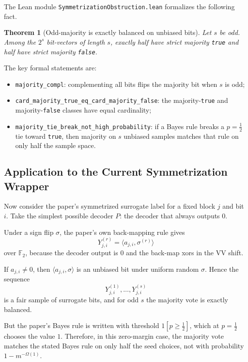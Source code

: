 \documentclass[11pt]{article}
\newtheorem{theorem}{Theorem}[section]
\theoremstyle{remark}
\begin{document}
The Lean module \texttt{SymmetrizationObstruction.lean} formalizes the following fact.

\begin{theorem}[Odd-majority is exactly balanced on unbiased bits]
Let \(s\) be odd.  Among the \(2^s\) bit-vectors of length \(s\), exactly half have strict majority
\texttt{true} and half have strict majority \texttt{false}.
\end{theorem}

\noindent
The key formal statements are:
\begin{itemize}[leftmargin=1.5em]
  \item \texttt{majority\_compl}: complementing all bits flips the majority bit when \(s\) is odd;
  \item \texttt{card\_majority\_true\_eq\_card\_majority\_false}: the majority-\texttt{true} and
  majority-\texttt{false} classes have equal cardinality;
  \item \texttt{majority\_tie\_break\_not\_high\_probability}: if a Bayes rule breaks a
  \(p=\tfrac12\) tie toward \texttt{true}, then majority on \(s\) unbiased samples matches that rule
  on only half the sample space.
\end{itemize}

\subsection{Application to the Current Symmetrization Wrapper}

Now consider the paper's symmetrized surrogate label for a fixed block \(j\) and bit \(i\).  Take
the simplest possible decoder \(P\): the decoder that always outputs \(0\).

Under a sign flip \(\sigma\), the paper's own back-mapping rule gives
\[
  Y^{(r)}_{j,i} = \langle a_{j,i}, \sigma^{(r)} \rangle
\]
over \(\mathbb{F}_2\), because the decoder output is \(0\) and the back-map xors in the VV shift.

If \(a_{j,i} \neq 0\), then \(\langle a_{j,i}, \sigma \rangle\) is an unbiased bit under uniform random
\(\sigma\).  Hence the sequence
\[
  Y^{(1)}_{j,i}, \dots, Y^{(s)}_{j,i}
\]
is a fair sample of surrogate bits, and for odd \(s\) the majority vote is exactly balanced.

But the paper's Bayes rule is written with threshold \(1[p \ge \tfrac12]\), which at \(p=\tfrac12\)
chooses the value \(1\).  Therefore, in this zero-margin case, the majority vote matches the stated
Bayes rule on only half the seed choices, not with probability \(1 - m^{-\Omega(1)}\).
\end{document}
